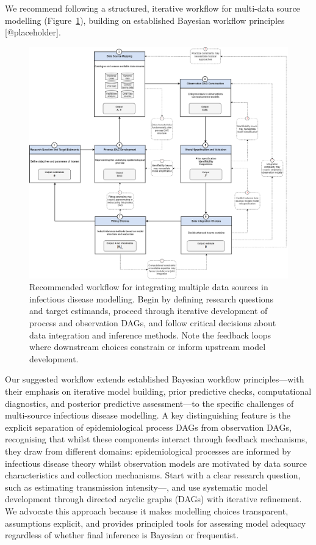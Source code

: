 \documentclass{article}
\begin{document}
We recommend following a structured, iterative workflow for multi-data source modelling (Figure~\ref{fig:workflow}), building on established Bayesian workflow principles [@placeholder].

\begin{figure}[htbp]
    \centering
    \includegraphics[width=\textwidth]{figures/visualization of core steps.drawio.png}
    \caption{Recommended workflow for integrating multiple data sources in infectious disease modelling. Begin by defining research questions and target estimands, proceed through iterative development of process and observation DAGs, and follow critical decisions about data integration and inference methods. Note the feedback loops where downstream choices constrain or inform upstream model development.}
    \label{fig:workflow}
\end{figure}

Our suggested workflow extends established Bayesian workflow principles—with their emphasis on iterative model building, prior predictive checks, computational diagnostics, and posterior predictive assessment—to the specific challenges of multi-source infectious disease modelling.
A key distinguishing feature is the explicit separation of epidemiological process DAGs from observation DAGs, recognising that whilst these components interact through feedback mechanisms, they draw from different domains: epidemiological processes are informed by infectious disease theory whilst observation models are motivated by data source characteristics and collection mechanisms.
Start with a clear research question, such as estimating transmission intensity—, and use systematic model development through directed acyclic graphs (DAGs) with iterative refinement.
We advocate this approach because it makes modelling choices transparent, assumptions explicit, and provides principled tools for assessing model adequacy regardless of whether final inference is Bayesian or frequentist.
\end{document}

